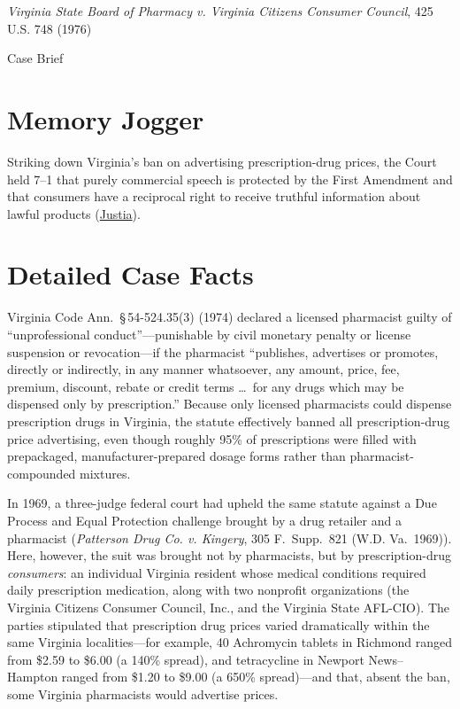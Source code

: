 \documentclass[12pt]{article}
\begin{document}
\begin{center}
{\LARGE \textit{Virginia State Board of Pharmacy v. Virginia Citizens Consumer Council}, 425 U.S. 748 (1976)\par}
\vspace{0.8em}
{\large Case Brief\par}
\end{center}
\vspace{1em}

\section{Memory Jogger}
Striking down Virginia's ban on advertising prescription-drug prices, the Court held 7--1 that purely commercial speech is protected by the First Amendment and that consumers have a reciprocal right to receive truthful information about lawful products (\href{https://supreme.justia.com/cases/federal/us/425/748/}{Justia}).

\section{Detailed Case Facts}
Virginia Code Ann.\ \S\,54-524.35(3) (1974) declared a licensed pharmacist guilty of ``unprofessional conduct''---punishable by civil monetary penalty or license suspension or revocation---if the pharmacist ``publishes, advertises or promotes, directly or indirectly, in any manner whatsoever, any amount, price, fee, premium, discount, rebate or credit terms \dots\ for any drugs which may be dispensed only by prescription.'' Because only licensed pharmacists could dispense prescription drugs in Virginia, the statute effectively banned all prescription-drug price advertising, even though roughly 95\% of prescriptions were filled with prepackaged, manufacturer-prepared dosage forms rather than pharmacist-compounded mixtures.

In 1969, a three-judge federal court had upheld the same statute against a Due Process and Equal Protection challenge brought by a drug retailer and a pharmacist (\textit{Patterson Drug Co. v. Kingery}, 305 F.\ Supp.\ 821 (W.D. Va.\ 1969)). Here, however, the suit was brought not by pharmacists, but by prescription-drug \textit{consumers}: an individual Virginia resident whose medical conditions required daily prescription medication, along with two nonprofit organizations (the Virginia Citizens Consumer Council, Inc., and the Virginia State AFL-CIO). The parties stipulated that prescription drug prices varied dramatically within the same Virginia localities---for example, 40 Achromycin tablets in Richmond ranged from \$2.59 to \$6.00 (a 140\% spread), and tetracycline in Newport News--Hampton ranged from \$1.20 to \$9.00 (a 650\% spread)---and that, absent the ban, some Virginia pharmacists would advertise prices.
\end{document}
